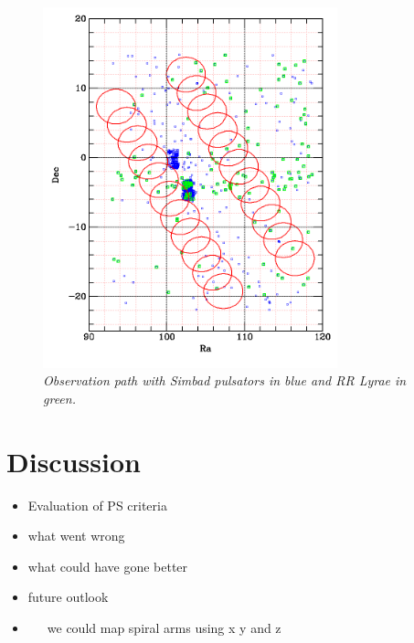 \documentclass[aps,prb,twocolumn,superscriptaddress]{revtex4-1}
\begin{document}
\begin{figure}[H]
 \centering
 	\includegraphics[width=3.35in]{figures/simbadoverlap.png}
 \caption{\it \small{Observation path with Simbad pulsators in blue and RR Lyrae in green.}}
 \label{fig:simoverlap}
\end{figure}





\section{Discussion}
\begin{itemize}
	\item{} Evaluation of PS criteria
	\item{} what went wrong
	\item{} what could have gone better
	\item{} future outlook
	\item{}~~~we could map spiral arms using x y and z
\end{itemize}
\end{document}

